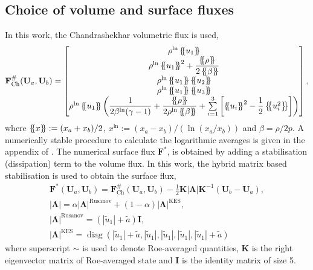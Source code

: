 \documentclass[a4paper,11pt,oneside]{article}
\newcommand{\vect}[1]{\ensuremath{\boldsymbol{\mathbf{#1}}}} %
\newcommand{\abs}[1]{\ensuremath{\left\lvert#1\right\rvert}} %
\DeclareMathOperator{\diag}{diag} %
\newcommand{\defeq}{\ensuremath{:=}} %
\newcommand{\avg}[1]{\ensuremath{\left\{ \mskip-5mu \left\{ #1 \right\} \mskip-5mu \right\}}} %
\newcommand{\textch}{\text{Ch}} %
\newcommand{\textln}{\text{ln}} %
\newcommand{\eulerref}[1]{\ensuremath{#1}} %
\begin{document}
\subsection{Choice of volume and surface fluxes}
\label{subsec:vol_surf_flux}
In this work, the Chandrashekhar volumetric flux \cite{gassnerWintersKopriva2016,chandrashekar2013} is used,
\begin{equation*}
	\vect{\eulerref{F}}^\#_\textch(\vect{\eulerref{U}}_a, \vect{\eulerref{U}}_b) =
	\begin{bmatrix}
		\rho^\textln \avg{u_1} \\
		\rho^\textln \avg{u_1}^2 + \dfrac{\avg{\rho}}{2\avg{\beta}} \\
		\rho^\textln \avg{u_1} \avg{u_2} \\
		\rho^\textln \avg{u_1} \avg{u_3} \\
		\rho^\textln \avg{u_1} \left( \dfrac{1}{2\beta^\textln (\gamma-1)} + \dfrac{\avg{\rho}}{2\rho^\textln \avg{\beta}} + \sum\limits_{i=1}^{3} \left[ \avg{u_i}^2 - \dfrac{1}{2} \avg{u_i^2} \right] \right)
	\end{bmatrix},
	\label{eq:1d_chandrashekhar_volume_flux}
\end{equation*}
where $\avg{x} \defeq (x_a + x_b)/2$, $x^\textln \defeq (x_a - x_b)/(\ln (x_a/x_b))$ and $\beta = \rho/2p$. A numerically stable procedure to calculate the logarithmic averages is given in the appendix of \cite{ismailRoe2009}. The numerical surface flux $\vect{\eulerref{F}}^*$, is obtained by adding a stabilisation (dissipation) term to the volume flux. In this work, the hybrid matrix based stabilisation \cite{chandrashekar2013} is used to obtain the surface flux,
\begin{gather}
	\vect{\eulerref{F}}^*(\vect{\eulerref{U}}_a, \vect{\eulerref{U}}_b) = \vect{\eulerref{F}}^\#_\textch(\vect{\eulerref{U}}_a, \vect{\eulerref{U}}_b) - \frac{1}{2} \vect{K} \abs{\vect{\Lambda}} \vect{K}^{-1} \left( \vect{\eulerref{U}}_b - \vect{\eulerref{U}}_a \right),\\
	\abs{\vect{\Lambda}} = \alpha \abs{\vect{\Lambda}}^\text{Rusanov} + (1-\alpha) \abs{\vect{\Lambda}}^\text{KES},\\
	\abs{\vect{\Lambda}}^\text{Rusanov} = (\abs{\tilde{u}_1} + \tilde{a}) \vect{I},\\
	\abs{\vect{\Lambda}}^\text{KES} = \diag \left( \abs{\tilde{u}_1} + \tilde{a}, \abs{\tilde{u}_1}, \abs{\tilde{u}_1}, \abs{\tilde{u}_1}, \abs{\tilde{u}_1} + \tilde{a} \right)
	\label{eq:1d_chandrashekhar_surface_flux}
\end{gather}
where superscript $\sim$ is used to denote Roe-averaged quantities, $\vect{K}$ is the right eigenvector matrix of Roe-averaged state and $\vect{I}$ is the identity matrix of size 5.
\end{document}
